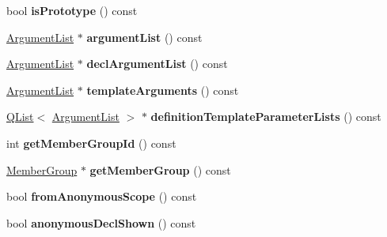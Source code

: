 \begin{DoxyCompactItemize}
\item 
\hypertarget{class_member_def_ae0d29f1a0dfb97f4324cdc3b1c4fa389}{bool {\bfseries is\-Prototype} () const }\label{class_member_def_ae0d29f1a0dfb97f4324cdc3b1c4fa389}

\item 
\hypertarget{class_member_def_a32f94de82277f8c4386eddc1546c899f}{\hyperlink{class_argument_list}{Argument\-List} $\ast$ {\bfseries argument\-List} () const }\label{class_member_def_a32f94de82277f8c4386eddc1546c899f}

\item 
\hypertarget{class_member_def_ab9a875b127e3d3bc784a99b8f2c3ff15}{\hyperlink{class_argument_list}{Argument\-List} $\ast$ {\bfseries decl\-Argument\-List} () const }\label{class_member_def_ab9a875b127e3d3bc784a99b8f2c3ff15}

\item 
\hypertarget{class_member_def_a7a7099c182d85b097ec9b4ac866db827}{\hyperlink{class_argument_list}{Argument\-List} $\ast$ {\bfseries template\-Arguments} () const }\label{class_member_def_a7a7099c182d85b097ec9b4ac866db827}

\item 
\hypertarget{class_member_def_a431e4308c43d92b7769a3ec67e730d11}{\hyperlink{class_q_list}{Q\-List}$<$ \hyperlink{class_argument_list}{Argument\-List} $>$ $\ast$ {\bfseries definition\-Template\-Parameter\-Lists} () const }\label{class_member_def_a431e4308c43d92b7769a3ec67e730d11}

\item 
\hypertarget{class_member_def_a675a7039f278ab149ae9429e6b159540}{int {\bfseries get\-Member\-Group\-Id} () const }\label{class_member_def_a675a7039f278ab149ae9429e6b159540}

\item 
\hypertarget{class_member_def_ae63067cb47048c7a49aa0f239224864e}{\hyperlink{class_member_group}{Member\-Group} $\ast$ {\bfseries get\-Member\-Group} () const }\label{class_member_def_ae63067cb47048c7a49aa0f239224864e}

\item 
\hypertarget{class_member_def_acc04b7fd7472d0b6071432f57b662703}{bool {\bfseries from\-Anonymous\-Scope} () const }\label{class_member_def_acc04b7fd7472d0b6071432f57b662703}

\item 
\hypertarget{class_member_def_a09be41b5c2bfcb0df2de2a7cb33da0ba}{bool {\bfseries anonymous\-Decl\-Shown} () const }\label{class_member_def_a09be41b5c2bfcb0df2de2a7cb33da0ba}


\end{DoxyCompactItemize}
